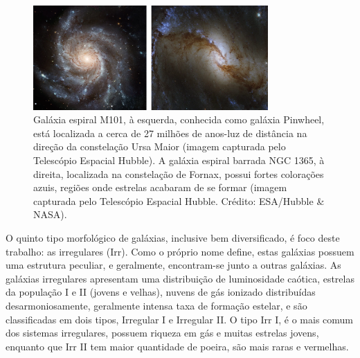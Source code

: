 \begin{figure}[h] 
  \centering 
  \includegraphics[width=0.8\textwidth]{Imagens/espirais.png} 
  \caption[Galáxia espiral M101 e espiral barrada NGC 1365.]{Galáxia espiral M101, à esquerda, conhecida como galáxia Pinwheel\footnotemark, está localizada a cerca de 27 milhões de anos-luz de distância na direção da constelação Ursa Maior (imagem capturada pelo Telescópio Espacial Hubble). A galáxia espiral barrada NGC 1365, à direita, localizada na constelação de Fornax, possui fortes colorações azuis, regiões onde estrelas acabaram de se formar (imagem capturada pelo Telescópio Espacial Hubble. Crédito: ESA/Hubble \& NASA).}
  \label{fig:espirais} 
\end{figure}

O quinto tipo morfológico de galáxias, inclusive bem diversificado, é foco deste trabalho: as irregulares (Irr). Como o próprio nome define, estas galáxias possuem uma estrutura peculiar, e geralmente, encontram-se junto a outras galáxias. As galáxias irregulares apresentam uma distribuição de luminosidade caótica, estrelas da população I e II (jovens e velhas), nuvens de gás ionizado distribuídas desarmoniosamente, geralmente intensa taxa de formação estelar, e são classificadas em dois tipos, Irregular I e Irregular II. O tipo Irr I, é o mais comum dos sistemas irregulares, possuem riqueza em gás e muitas estrelas jovens, enquanto que Irr II tem maior quantidade de poeira, são mais raras e vermelhas.

